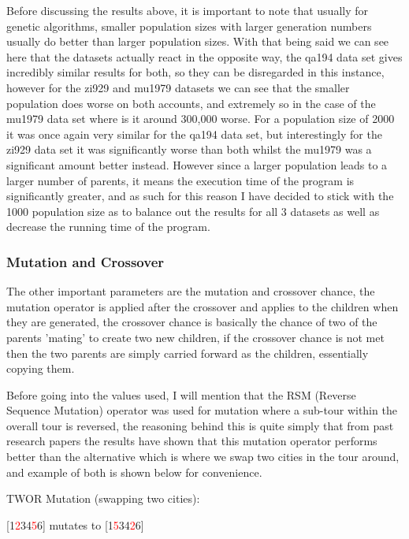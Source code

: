\documentclass[11pt,a4paper,titlepage]{article}
\begin{document}
Before discussing the results above, it is important to note that usually for genetic algorithms, smaller population sizes with larger generation numbers usually do better than larger population sizes. With that being said we can see here that the datasets actually react in the opposite way, the qa194 data set gives incredibly similar results for both, so they can be disregarded in this instance, however for the zi929 and mu1979 datasets we can see that the smaller population does worse on both accounts, and extremely so in the case of the mu1979 data set where is it around 300,000 worse. For a population size of 2000 it was once again very similar for the qa194 data set, but interestingly for the zi929 data set it was significantly worse than both whilst the mu1979 was a significant amount better instead. However since a larger population leads to a larger number of parents, it means the execution time of the program is significantly greater, and as such for this reason I have decided to stick with the 1000 population size as to balance out the results for all 3 datasets as well as decrease the running time of the program.

\subsubsection{Mutation and Crossover}

The other important parameters are the mutation and crossover chance, the mutation operator is applied after the crossover and applies to the children when they are generated, the crossover chance is basically the chance of two of the parents 'mating' to create two new children, if the crossover chance is not met then the two parents are simply carried forward as the children, essentially copying them.

Before going into the values used, I will mention that the RSM (Reverse Sequence Mutation) operator was used for mutation where a sub-tour within the overall tour is reversed, the reasoning behind this is quite simply that from past research papers the results have shown that this mutation operator performs better than the alternative \cite{GAMutations} which is where we swap two cities in the tour around, and example of both is shown below for convenience.

TWOR Mutation (swapping two cities):
\begin{center}\Large
[1\textcolor{red}{2}34\textcolor{red}{5}6] mutates to [1\textcolor{red}{5}34\textcolor{red}{2}6]
\end{center}
\end{document}
